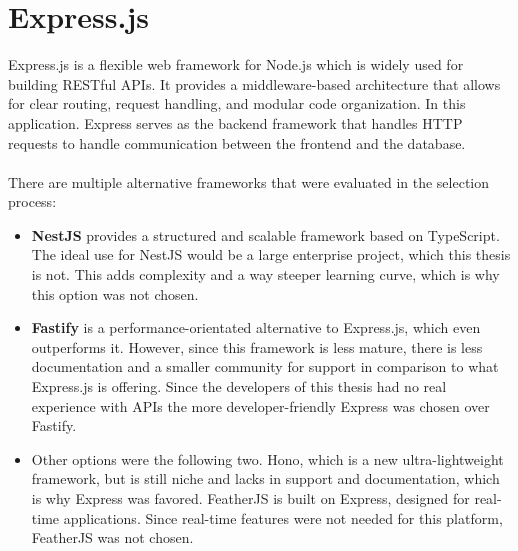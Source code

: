 \documentclass[a4paper,12pt]{report}
\begin{document}
\section{Express.js}
Express.js is a flexible web framework for Node.js which is widely used for building RESTful APIs. It provides a middleware-based architecture that allows for clear routing, request handling, and modular code organization. In this application. Express serves as the backend framework that handles HTTP requests to handle communication between the frontend and the database. \cite{expr-base} \\ \\
There are multiple alternative frameworks that were evaluated in the selection process:
\begin{itemize}
	\item \textbf{NestJS} provides a structured and scalable framework based on TypeScript. The ideal use for NestJS would be a large enterprise project, which this thesis is not. This adds complexity and a way steeper learning curve, which is why this option was not chosen. \cite{expr-comp} \cite{expr-comp2} \cite{nest-js}
	\item \textbf{Fastify} is a performance-orientated alternative to Express.js, which even outperforms it. However, since this framework is less mature, there is less documentation and a smaller community for support in comparison to what Express.js is offering. Since the developers of this thesis had no real experience with APIs the more developer-friendly Express was chosen over Fastify. \cite{expr-comp} \cite{expr-comp2}
	\item Other options were the following two. Hono, which is a new ultra-lightweight framework, but is still niche and lacks in support and documentation, which is why Express was favored. FeatherJS is built on Express, designed for real-time applications. Since real-time features were not needed for this platform, FeatherJS was not chosen. \cite{expr-comp} \cite{expr-comp2}
\end{itemize}
\end{document}
